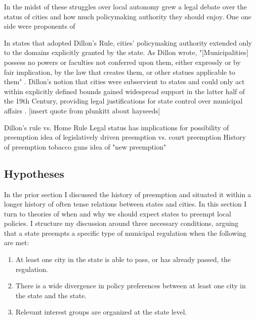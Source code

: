 \documentclass[12pt]{article}
\begin{document}
In the midst of these struggles over local autonomy grew a legal debate over the status of cities and how much policymaking authority they should enjoy. One one side were proponents of 




 In states that adopted Dillon's Rule, cities' policymaking authority extended only to the domains explicitly granted by the state. As Dillon wrote, "[Municipalities] possess no powers or faculties not conferred upon them, either expressly or by fair implication, by the law that creates them, or other statues applicable to them" \parencite[p. 93]{dillonLawMunicipalCorporations1873}. Dillon's notion that cities were subservient to states and could only act within explicitly defined bounds gained widespread support in the latter half of the 19th Century, providing legal justifications for state control over municipal affairs . [insert quote from plunkitt about hayseeds]

\newpage
Dillon's rule vs. Home Rule
Legal status has implications for possibility of preemption
	idea of legislatively driven preemption vs. court preemption
History of preemption 
	tobacco
	guns
	idea of "new preemption"

\newpage
\subsection*{Hypotheses}
In the prior section I discussed the history of preemption and situated it within a longer history of often tense relations between states and cities. In this section I turn to theories of when and why we should expect states to preempt local policies. I structure my discussion around three necessary conditions, arguing that a state preempts a specific type of municipal regulation when the following are met:

\singlespacing
\begin{enumerate}
	\item At least one city in the state is able to pass, or has already passed, the regulation.
	\item There is a wide divergence in policy preferences between at least one city in the state and the state.
	\item Relevant interest groups are organized at the state level. 
\end{enumerate}
\doublespacing
\end{document}
